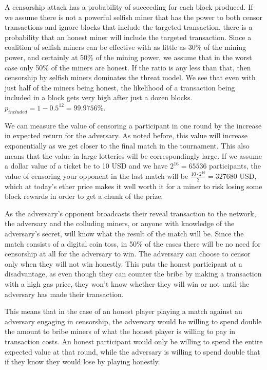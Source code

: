 A censorship attack has a probability of succeeding for each block produced. If we assume there is not a powerful selfish miner that has the power to both censor transactions and ignore blocks that include the targeted transaction, there is a probability that an honest miner will include the targeted transaction. Since a coalition of selfish miners can be effective with as little as 30\% of the mining power, and certainly at 50\% of the mining power, we assume that in the worst case only 50\% of the miners are honest. If the ratio is any less than that, then censorship by selfish miners dominates the threat model. We see that even with just half of the miners being honest, the likelihood of a transaction being included in a block gets very high after just a dozen blocks. $p_{included} = 1-0.5^{12}=99.9756\%$.

We can measure the value of censoring a participant in one round by the increase in expected return for the adversary. As noted before, this value will increase exponentially as we get closer to the final match in the tournament. This also means that the value in large lotteries will be correspondingly large. If we assume a dollar value of a ticket be to 10 USD and we have $2^{16}=65536$ participants, the value of censoring your opponent in the last match will be $\frac{10 \cdot 2^{16}}{2}=327680$ USD, which at today's ether price makes it well worth it for a miner to risk losing some block rewards in order to get a chunk of the prize.

As the adversary's opponent broadcasts their reveal transaction to the network, the adversary and the colluding miners, or anyone with knowledge of the adversary's secret, will know what the result of the match will be. Since the match consists of a digital coin toss, in 50\% of the cases there will be no need for censorship at all for the adversary to win. The adversary can choose to censor only when they will not win honestly. This puts the honest participant at a disadvantage, as even though they can counter the bribe by making a transaction with a high gas price, they won't know whether they will win or not until the adversary has made their transaction.

This means that in the case of an honest player playing a match against an adversary engaging in censorship, the adversary would be willing to spend double the amount to bribe miners of what the honest player is willing to pay in transaction costs. An honest participant would only be willing to spend the entire expected value at that round, while the adversary is willing to spend double that if they know they would lose by playing honestly.

